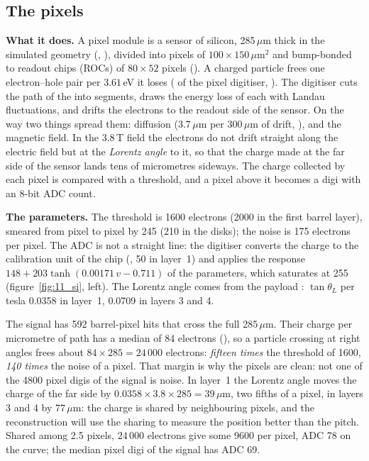 \FloatBarrier
\subsection{The pixels}
\label{sec:11_pixel}

\textbf{What it does.} A pixel module is a sensor of silicon, 285\,$\mu$m thick in the simulated geometry
(, ), divided into pixels of
$100\times150\,\mu$m$^2$ and bump-bonded to readout chips (ROCs) of $80\times52$ pixels
(). A charged particle frees one electron--hole pair per $3.61$\,eV it loses
( of the pixel digitiser, ). The digitiser cuts
the path of the  into segments, draws the energy loss of each with Landau fluctuations, and drifts the
electrons to the readout side of the sensor. On the way two things spread them: diffusion ($3.7\,\mu$m per
$300\,\mu$m of drift, ), and the magnetic field. In the $3.8$\,T field the electrons do not drift straight
along the electric field but at the \emph{Lorentz angle} to it, so that the charge made at the far side of the sensor
lands tens of micrometres sideways. The charge collected by each pixel is compared with a threshold, and a pixel above it
becomes a digi with an 8-bit ADC count.

\textbf{The parameters.} The threshold is 1600 electrons (2000 in the first barrel layer), smeared from pixel to pixel
by 245 (210 in the disks); the noise is 175 electrons per pixel. The ADC is not a straight line: the digitiser
converts the charge to the calibration unit of the chip (, 50 in layer~1) and applies the
response $148+203\tanh(0.00171\,v-0.711)$ of the  parameters, which saturates at 255
(figure~\ref{fig:11_si}, left). The Lorentz angle comes from the payload
: $\tan\theta_L$ per tesla 0.0358 in layer~1, 0.0709 in
layers 3 and 4.

\begin{plainwords}
The signal has 592 barrel-pixel hits that cross the full 285\,$\mu$m. Their charge per micrometre of path has a median
of 84 electrons (), so a particle crossing at right angles frees about $84\times285=
24\,000$ electrons: \emph{fifteen times} the threshold of 1600, \emph{140 times} the noise of a pixel. That margin is
why the pixels are clean: not one of the 4800 pixel digis of the signal is noise. In layer~1 the Lorentz angle moves the
charge of the far side by $0.0358\times3.8\times285 = 39\,\mu$m, two fifths of a pixel, in layers 3 and 4 by
$77\,\mu$m: the charge is shared by neighbouring pixels, and the reconstruction will use the sharing to measure the
position better than the pitch. Shared among 2.5 pixels, $24\,000$ electrons give some 9600 per pixel, ADC 78 on the
curve; the median pixel digi of the signal has ADC 69.
\end{plainwords}

